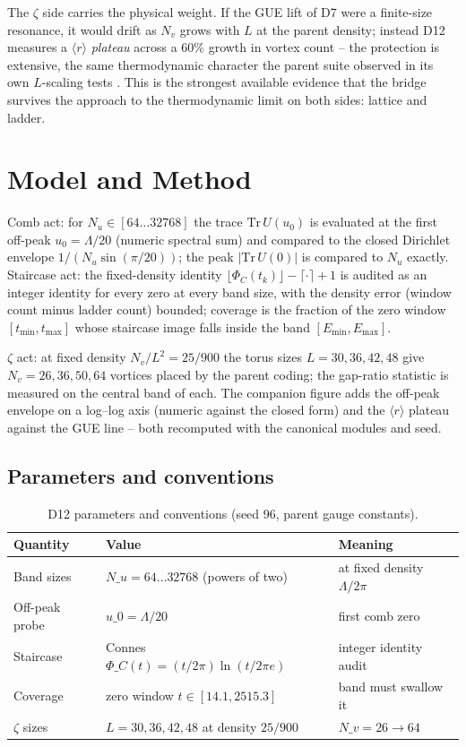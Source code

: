 \documentclass[11pt,a4paper]{article}
\begin{document}
The $\zeta$ side carries the physical weight. If the GUE lift of D7 were a finite-size resonance, it would drift as $N_v$ grows with $L$ at the parent density; instead D12 measures a $\langle r\rangle$ \emph{plateau} across a $60\%$ growth in vortex count -- the protection is extensive, the same thermodynamic character the parent suite observed in its own $L$-scaling tests \cite{parent}. This is the strongest available evidence that the bridge survives the approach to the thermodynamic limit on both sides: lattice and ladder.

\section{Model and Method}
Comb act: for $N_u \in [64 \ldots 32768]$ the trace $\mathrm{Tr}\,U(u_0)$ is evaluated at the first off-peak $u_0 = \Lambda/20$ (numeric spectral sum) and compared to the closed Dirichlet envelope $1/(N_u \sin(\pi/20))$; the peak $|\mathrm{Tr}\,U(0)|$ is compared to $N_u$ exactly. Staircase act: the fixed-density identity $\lfloor \Phi_C(t_k) \rfloor - \lceil \cdot \rceil + 1$ is audited as an integer identity for every zero at every band size, with the density error (window count minus ladder count) bounded; coverage is the fraction of the zero window $[t_{\min}, t_{\max}]$ whose staircase image falls inside the band $[E_{\min}, E_{\max}]$.

$\zeta$ act: at fixed density $N_v/L^2 = 25/900$ the torus sizes $L = 30, 36, 42, 48$ give $N_v = 26, 36, 50, 64$ vortices placed by the parent coding; the gap-ratio statistic is measured on the central band of each. The companion figure adds the off-peak envelope on a log--log axis (numeric against the closed form) and the $\langle r\rangle$ plateau against the GUE line -- both recomputed with the canonical modules and seed.

\subsection{Parameters and conventions}
\begin{table}[htbp]\centering\small
\begin{tabularx}{\columnwidth}{@{}l l X@{}}
\toprule
Quantity & Value & Meaning \\
\midrule
Band sizes & $N\_u = 64 \ldots 32768$ (powers of two) & at fixed density $\Lambda/2\pi$ \\
Off-peak probe & $u\_0 = \Lambda/20$ & first comb zero \\
Staircase & Connes $\Phi\_C(t) = (t/2\pi)\ln(t/2\pi e)$ & integer identity audit \\
Coverage & zero window $t \in [14.1, 2515.3]$ & band must swallow it \\
$\zeta$ sizes & $L = 30, 36, 42, 48$ at density $25/900$ & $N\_v = 26 \to 64$ \\
\bottomrule
\end{tabularx}
\caption{D12 parameters and conventions (seed 96, parent gauge constants).}
\end{table}
\end{document}

